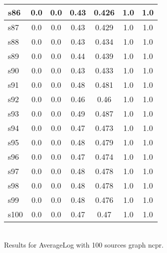 \documentclass{article}
\begin{document}
\begin{tabular}{|l|c|c|c|c|c|c|}
\hline
s86 &0.0 & 0.0 & 0.43 & 0.426 & 1.0 & 1.0\\
\hline
s87 &0.0 & 0.0 & 0.43 & 0.429 & 1.0 & 1.0\\
\hline
s88 &0.0 & 0.0 & 0.43 & 0.434 & 1.0 & 1.0\\
\hline
s89 &0.0 & 0.0 & 0.44 & 0.439 & 1.0 & 1.0\\
\hline
s90 &0.0 & 0.0 & 0.43 & 0.433 & 1.0 & 1.0\\
\hline
s91 &0.0 & 0.0 & 0.48 & 0.481 & 1.0 & 1.0\\
\hline
s92 &0.0 & 0.0 & 0.46 & 0.46 & 1.0 & 1.0\\
\hline
s93 &0.0 & 0.0 & 0.49 & 0.487 & 1.0 & 1.0\\
\hline
s94 &0.0 & 0.0 & 0.47 & 0.473 & 1.0 & 1.0\\
\hline
s95 &0.0 & 0.0 & 0.48 & 0.479 & 1.0 & 1.0\\
\hline
s96 &0.0 & 0.0 & 0.47 & 0.474 & 1.0 & 1.0\\
\hline
s97 &0.0 & 0.0 & 0.48 & 0.478 & 1.0 & 1.0\\
\hline
s98 &0.0 & 0.0 & 0.48 & 0.478 & 1.0 & 1.0\\
\hline
s99 &0.0 & 0.0 & 0.48 & 0.476 & 1.0 & 1.0\\
\hline
s100 &0.0 & 0.0 & 0.47 & 0.47 & 1.0 & 1.0\\
\hline
\end{tabular}\\

\noindent Results for AverageLog with 100 sources graph ncpr.
\end{document}
